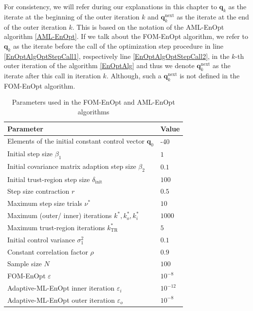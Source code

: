 For consistency, we will refer during our explanations in this chapter to $\mathbf{q}_k$ as the iterate at the beginning of the outer iteration $k$ and $\mathbf{q}^\mathrm{next}_k$ as the iterate at the end of the outer iteration $k$. This is based on the notation of the AML-EnOpt algorithm \ref{AML-EnOpt}. If we talk about the FOM-EnOpt algorithm, we refer to $\mathbf{q}_k$ as the iterate before the call of the optimization step procedure in line \ref{EnOptAlgOptStepCall1}, respectively line \ref{EnOptAlgOptStepCall2}, in the $k$-th outer iteration of the algorithm \ref{EnOptAlg} and thus we denote $\mathbf{q}^\mathrm{next}_k$ as the iterate after this call in iteration $k$. Although, such a $\mathbf{q}^\mathrm{next}_k$ is not defined in the FOM-EnOpt algorithm.

\begin{table}
\caption{\label{FOMAMLEnOptParameters}Parameters used in the FOM-EnOpt and AML-EnOpt algorithms}
\centering
\begin{tabular}{ll}
\hline
Parameter & Value\\
\hline
Elements of the initial constant control vector $\mathbf{q}_0$ & -40\\
Initial step size $\beta_1$ & $1$\\
Initial covariance matrix adaption step size $\beta_2$ & $0.1$\\
Initial trust-region step size $\delta_\mathrm{init}$ & $100$\\
Step size contraction $r$ & $0.5$\\
Maximum step size trials $\nu^*$ & $10$\\
Maximum (outer/ inner) iterations $k^*, k^*_o, k^*_i$ & $1000$\\
Maximum trust-region iterations $k^*_\mathrm{TR}$ & $5$\\
Initial control variance $\sigma^2_1$ & $0.1$\\
Constant correlation factor $\rho$ & $0.9$\\
Sample size $N$ & $100$\\
FOM-EnOpt $\varepsilon$ & $10^{-8}$\\
Adaptive-ML-EnOpt inner iteration $\varepsilon_i$ & $10^{-12}$\\
Adaptive-ML-EnOpt outer iteration $\varepsilon_o$ & $10^{-8}$\\
\hline
\end{tabular}
\end{table}

